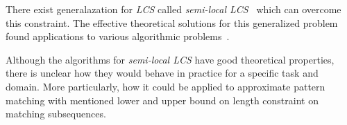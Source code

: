 There exist generalazation for \emph{LCS} called \emph{semi-local LCS}~\cite{tiskin2008semi} which can overcome this constraint. 
The effective theoretical solutions for this generalized problem found applications to various algorithmic problems~\cite{tiskin2009periodic,tiskin2006longest,tiskin2011towards}.

Although the algorithms for \emph{semi-local LCS} have good theoretical properties, there is unclear how they would behave in practice for a specific task and domain.
More particularly, how it could be applied to approximate pattern matching with mentioned lower and upper bound on length constraint on matching subsequences.
